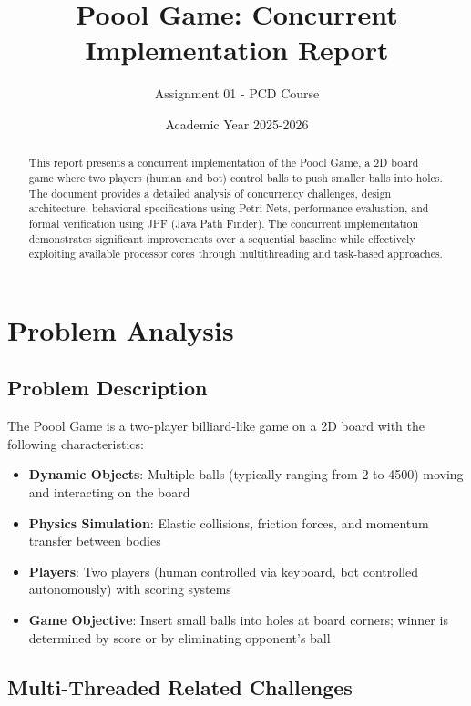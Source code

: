 \documentclass[12pt,a4paper]{article}
\title{Poool Game: Concurrent Implementation Report}
\author{Assignment 01 - PCD Course}
\date{Academic Year 2025-2026}
\begin{document}
\maketitle

\begin{abstract}
This report presents a concurrent implementation of the Poool Game, a 2D board game where two players (human and bot) control balls to push smaller balls into holes. The document provides a detailed analysis of concurrency challenges, design architecture, behavioral specifications using Petri Nets, performance evaluation, and formal verification using JPF (Java Path Finder). The concurrent implementation demonstrates significant improvements over a sequential baseline while effectively exploiting available processor cores through multithreading and task-based approaches.
\end{abstract}

\tableofcontents
\newpage

\section{Problem Analysis}

\subsection{Problem Description}
The Poool Game is a two-player billiard-like game on a 2D board with the following characteristics:

\begin{itemize}
    \item \textbf{Dynamic Objects}: Multiple balls (typically ranging from 2 to 4500) moving and interacting on the board
    \item \textbf{Physics Simulation}: Elastic collisions, friction forces, and momentum transfer between bodies
    \item \textbf{Players}: Two players (human controlled via keyboard, bot controlled autonomously) with scoring systems
    \item \textbf{Game Objective}: Insert small balls into holes at board corners; winner is determined by score or by eliminating opponent's ball
\end{itemize}

\subsection{Multi-Threaded Related Challenges}
\end{document}
